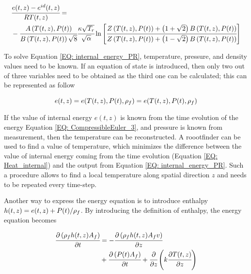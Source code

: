 \documentclass[../Article_Model_Parameters.tex]{subfiles}
\begin{document}
			{\scriptsize
				\begin{equation}
					\begin{aligned}
					&\cfrac{e(t,z)-e^{id}(t,z)}{RT(t,z)} = \\
					& - \cfrac{{\color{black}A}\left(T(t,z), {\color{black}P}(t)\right)}{{\color{black}B}\left(T(t,z), {\color{black}P}(t)\right)\sqrt{8}} \cfrac{{\color{black}\kappa} \sqrt{\color{black}T_r}}{\sqrt{\alpha}} \ln \left[ \cfrac{{\color{black}Z}\left(T(t,z), {\color{black}P}(t)\right)+\left( 1+\sqrt{2} \right){\color{black}B}\left(T(t,z), {\color{black}P}(t)\right)}{{\color{black}Z}\left(T(t,z), {\color{black}P}(t)\right)+\left( 1-\sqrt{2} \right){\color{black}B}\left(T(t,z), {\color{black}P}(t)\right)} \right]
					\label{EQ: internal_energy_PR}
				\end{aligned}
			\end{equation}
			}
			
			To solve Equation \ref{EQ: internal_energy_PR}, temperature, pressure, and density values need to be known. If an equation of state is introduced, then only two out of three variables need to be obtained as the third one can be calculated; this can be represented as follow
			
			{\footnotesize
			\begin{equation}
				e(t,z)=e(T(t,z),{\color{black}P}(t),\rho_f)=e( T(t,z),{\color{black}P}(t), \rho_f ) 
			\end{equation}
			}
		
			If the value of internal energy $e(t,z)$ is known from the time evolution of the energy Equation \ref{EQ: CompressibleEuler_3}, and pressure is known from measurement, then the temperature can be reconstructed. A roootfinder can be used to find a value of temperature, which minimizes the difference between the value of internal energy coming from the time evolution (Equation \ref{EQ: Heat_internal}) and the output from Equation \ref{EQ: internal_energy_PR}. Such a procedure allows to find a local temperature along spatial direction $z$ and needs to be repeated every time-step.
		
			Another way to express the energy equation is to introduce enthalpy ${\color{black}h}(t,z) = e(t,z) + {\color{black}P}(t) / \rho_f$. By introducing the definition of enthalpy, the energy equation becomes
			
			{\footnotesize
				\begin{align} \label{EQ:Enthalpy_equation}
					\cfrac{\partial \left(\rho_f {\color{black}h}(t,z) A_f\right)}{\partial t} &= - \cfrac{\partial \left( \rho_f {\color{black}h}(t,z) A_f v \right)}{\partial z}  \nonumber \\
					& + \cfrac{\partial \left({\color{black}P}(t) A_f\right)}{\partial t} + \cfrac{\partial}{\partial z} \left( k \cfrac{\partial T(t,z)}{\partial z} \right)
				\end{align}
			}
		
\end{document}
